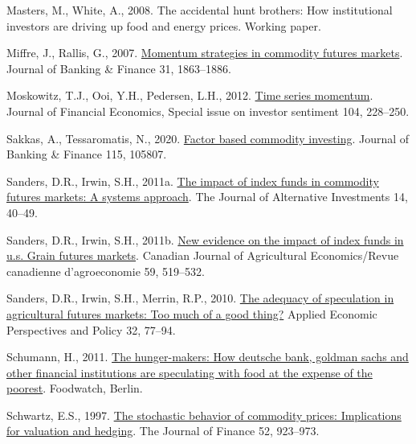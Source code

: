 \documentclass[]{elsarticle} %
\newlength{\cslhangindent}
\newlength{\cslentryspacingunit} %
\newenvironment{CSLReferences}[2] %
 {%
  \setlength{\parindent}{0pt}
  \ifodd #1
  \let\oldpar\par
  \def\par{\hangindent=\cslhangindent\oldpar}
  \fi
  \setlength{\parskip}{#2\cslentryspacingunit}
 }%
 {}
\begin{document}
\begin{CSLReferences}{1}{0}
\leavevmode{}%
Masters, M., White, A., 2008. The accidental hunt brothers: How institutional investors are driving up food and energy prices. Working paper.

\leavevmode{}%
Miffre, J., Rallis, G., 2007. \href{https://doi.org/10.1016/j.jbankfin.2006.12.005}{Momentum strategies in commodity futures markets}. Journal of Banking \& Finance 31, 1863--1886.

\leavevmode{}%
Moskowitz, T.J., Ooi, Y.H., Pedersen, L.H., 2012. \href{https://doi.org/10.1016/j.jfineco.2011.11.003}{Time series momentum}. Journal of Financial Economics, Special issue on investor sentiment 104, 228--250.

\leavevmode{}%
Sakkas, A., Tessaromatis, N., 2020. \href{https://doi.org/10.1016/j.jbankfin.2020.105807}{Factor based commodity investing}. Journal of Banking \& Finance 115, 105807.

\leavevmode{}%
Sanders, D.R., Irwin, S.H., 2011a. \href{https://doi.org/10.3905/jai.2011.14.1.040}{The impact of index funds in commodity futures markets: A systems approach}. The Journal of Alternative Investments 14, 40--49.

\leavevmode{}%
Sanders, D.R., Irwin, S.H., 2011b. \href{https://doi.org/10.1111/j.1744-7976.2011.01226.x}{New evidence on the impact of index funds in u.s. Grain futures markets}. Canadian Journal of Agricultural Economics/Revue canadienne d'agroeconomie 59, 519--532.

\leavevmode{}%
Sanders, D.R., Irwin, S.H., Merrin, R.P., 2010. \href{https://doi.org/10.1093/aepp/ppp006}{The adequacy of speculation in agricultural futures markets: Too much of a good thing?} Applied Economic Perspectives and Policy 32, 77--94.

\leavevmode{}%
Schumann, H., 2011. \href{https://www.foodwatch.org/uploads/media/foodwatchreport_TheHungerMakers_observationsandcallsforaction_ger_03.pdf}{The hunger-makers: How deutsche bank, goldman sachs and other financial institutions are speculating with food at the expense of the poorest}. Foodwatch, Berlin.

\leavevmode{}%
Schwartz, E.S., 1997. \href{https://doi.org/10.1111/j.1540-6261.1997.tb02721.x}{The stochastic behavior of commodity prices: Implications for valuation and hedging}. The Journal of Finance 52, 923--973.


\end{CSLReferences}
\end{document}
